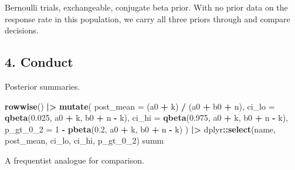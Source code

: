 \documentclass[
]{article}
\newenvironment{Shaded}{\begin{snugshade}}{\end{snugshade}}
\newcommand{\AttributeTok}[1]{\textcolor[rgb]{0.13,0.29,0.53}{#1}}
\newcommand{\DecValTok}[1]{\textcolor[rgb]{0.00,0.00,0.81}{#1}}
\newcommand{\FloatTok}[1]{\textcolor[rgb]{0.00,0.00,0.81}{#1}}
\newcommand{\FunctionTok}[1]{\textcolor[rgb]{0.13,0.29,0.53}{\textbf{#1}}}
\newcommand{\NormalTok}[1]{#1}
\newcommand{\SpecialCharTok}[1]{\textcolor[rgb]{0.81,0.36,0.00}{\textbf{#1}}}
\begin{document}
Bernoulli trials, exchangeable, conjugate beta prior. With no prior data
on the response rate in this population, we carry all three priors
through and compare decisions.

\subsection{4. Conduct}\label{conduct}

Posterior summaries.

\begin{Shaded}
\begin{Highlighting}[]
  \FunctionTok{rowwise}\NormalTok{() }\SpecialCharTok{|\textgreater{}}
  \FunctionTok{mutate}\NormalTok{(}
    \AttributeTok{post\_mean =}\NormalTok{ (a0 }\SpecialCharTok{+}\NormalTok{ k) }\SpecialCharTok{/}\NormalTok{ (a0 }\SpecialCharTok{+}\NormalTok{ b0 }\SpecialCharTok{+}\NormalTok{ n),}
    \AttributeTok{ci\_lo =} \FunctionTok{qbeta}\NormalTok{(}\FloatTok{0.025}\NormalTok{, a0 }\SpecialCharTok{+}\NormalTok{ k, b0 }\SpecialCharTok{+}\NormalTok{ n }\SpecialCharTok{{-}}\NormalTok{ k),}
    \AttributeTok{ci\_hi =} \FunctionTok{qbeta}\NormalTok{(}\FloatTok{0.975}\NormalTok{, a0 }\SpecialCharTok{+}\NormalTok{ k, b0 }\SpecialCharTok{+}\NormalTok{ n }\SpecialCharTok{{-}}\NormalTok{ k),}
    \AttributeTok{p\_gt\_0\_2 =} \DecValTok{1} \SpecialCharTok{{-}} \FunctionTok{pbeta}\NormalTok{(}\FloatTok{0.2}\NormalTok{, a0 }\SpecialCharTok{+}\NormalTok{ k, b0 }\SpecialCharTok{+}\NormalTok{ n }\SpecialCharTok{{-}}\NormalTok{ k)}
\NormalTok{  ) }\SpecialCharTok{|\textgreater{}}
\NormalTok{  dplyr}\SpecialCharTok{::}\FunctionTok{select}\NormalTok{(name, post\_mean, ci\_lo, ci\_hi, p\_gt\_0\_2)}
\NormalTok{summ}
\end{Highlighting}
\end{Shaded}

A frequentist analogue for comparison.

\begin{Shaded}
\end{Shaded}
\end{document}
